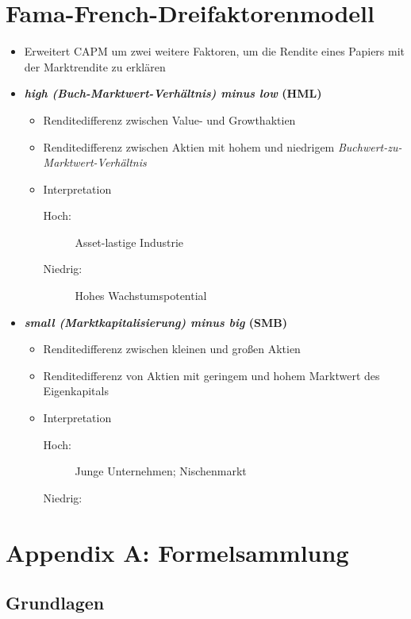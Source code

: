 \section{Fama-French-Dreifaktorenmodell}
\begin{itemize}
	\item Erweitert CAPM um zwei weitere Faktoren, um die Rendite eines Papiers mit der Marktrendite zu erklären
	\item \textbf{\textit{high (Buch-Marktwert-Verhältnis) minus low} (HML)}
	\begin{itemize}
		\item Renditedifferenz zwischen Value- und Growthaktien
		\item Renditedifferenz zwischen Aktien mit hohem und niedrigem \textit{Buchwert-zu-Marktwert-Verhältnis}
		\item Interpretation
		\begin{description}
			\item[Hoch:] Asset-lastige Industrie
			\item[Niedrig:] Hohes Wachstumspotential
		\end{description}
	\end{itemize}
	\item \textbf{\textit{small (Marktkapitalisierung) minus big} (SMB)}
	\begin{itemize}
		\item Renditedifferenz zwischen kleinen und großen Aktien
		\item Renditedifferenz von Aktien mit geringem und hohem Marktwert des Eigenkapitals
		\item Interpretation
		\begin{description}
			\item[Hoch:] Junge Unternehmen; Nischenmarkt
			\item[Niedrig:]
		\end{description}
	\end{itemize}
\end{itemize}



\section{Appendix A: Formelsammlung}

\subsection{Grundlagen}


